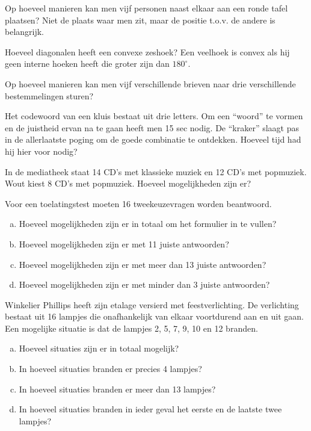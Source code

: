 \documentclass[12pt,twoside]{article}
\begin{document}
\begin{oefening}
Op hoeveel manieren kan men vijf personen naast elkaar aan een ronde tafel plaatsen? Niet de plaats waar men zit, maar de positie t.o.v. de andere is belangrijk.
\end{oefening}

\begin{oefening}
Hoeveel diagonalen heeft een convexe zeshoek? Een veelhoek is convex als hij geen interne hoeken heeft die groter zijn dan $180^\circ$.
\end{oefening}

\begin{oefening}
Op hoeveel manieren kan men vijf verschillende brieven naar drie verschillende bestemmelingen sturen?
\end{oefening}

\begin{oefening}
Het codewoord van een kluis bestaat uit drie letters. Om een “woord” te vormen en de juistheid
ervan na te gaan heeft men 15 sec nodig. De “kraker” slaagt pas in de allerlaatste poging om
de goede combinatie te ontdekken. Hoeveel tijd had hij hier voor nodig?
\end{oefening}

\begin{oefening}
In de mediatheek staat 14 CD's met klassieke muziek en 12 CD's met popmuziek. Wout kiest 8 CD's met popmuziek. Hoeveel mogelijkheden zijn er?
\end{oefening}

\begin{oefening}
Voor een toelatingstest moeten 16 tweekeuzevragen worden beantwoord.
\begin{enumerate}[(a)]
  \item Hoeveel mogelijkheden zijn er in totaal om het formulier in te vullen?
  \item Hoeveel mogelijkheden zijn er met 11 juiste antwoorden?
  \item Hoeveel mogelijkheden zijn er met meer dan 13 juiste antwoorden?
  \item Hoeveel mogelijkheden zijn er met minder dan 3 juiste antwoorden?
\end{enumerate}
\end{oefening}

\begin{oefening}
 Winkelier Phillips heeft zijn etalage versierd met feestverlichting. De verlichting bestaat uit 16 lampjes die onafhankelijk van elkaar voortdurend aan en uit gaan. Een mogelijke situatie is dat de lampjes 2, 5, 7, 9, 10 en 12 branden. 
\begin{enumerate}[(a)]
  \item Hoeveel situaties zijn er in totaal mogelijk?
  \item In hoeveel situaties branden er precies 4 lampjes?
  \item In hoeveel situaties branden er meer dan 13 lampjes?
  \item In hoeveel situaties branden in ieder geval het eerste en de laatste twee lampjes?
\end{enumerate}
\end{oefening}
\end{document}

